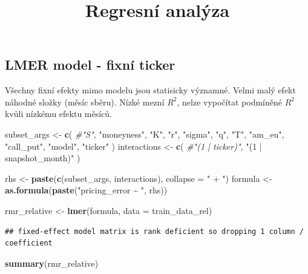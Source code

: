 \documentclass[
]{article}
\title{Regresní analýza}
\author{}
\date{\vspace{-2.5em}}
\newenvironment{Shaded}{\begin{snugshade}}{\end{snugshade}}
\newcommand{\AttributeTok}[1]{\textcolor[rgb]{0.13,0.29,0.53}{#1}}
\newcommand{\CommentTok}[1]{\textcolor[rgb]{0.56,0.35,0.01}{\textit{#1}}}
\newcommand{\FunctionTok}[1]{\textcolor[rgb]{0.13,0.29,0.53}{\textbf{#1}}}
\newcommand{\NormalTok}[1]{#1}
\newcommand{\OtherTok}[1]{\textcolor[rgb]{0.56,0.35,0.01}{#1}}
\newcommand{\StringTok}[1]{\textcolor[rgb]{0.31,0.60,0.02}{#1}}
\begin{document}
\maketitle

\subsection{LMER model - fixní
ticker}\label{lmer-model---fixnuxed-ticker}

Všechny fixní efekty mimo modelu jsou statisicky významné. Velmi malý
efekt náhodné složky (měsíc sběru). Nízké mezní \(R^2\), nelze vypočítat
podmíněné \(R^2\) kvůli nízkému efektu měsíců.

\begin{Shaded}
\begin{Highlighting}[]
\NormalTok{subset\_args }\OtherTok{\textless{}{-}} \FunctionTok{c}\NormalTok{(}
  \CommentTok{\#"S",}
  \StringTok{"moneyness"}\NormalTok{,}
  \StringTok{"K"}\NormalTok{,}
  \StringTok{"r"}\NormalTok{,}
  \StringTok{"sigma"}\NormalTok{,}
  \StringTok{"q"}\NormalTok{,}
  \StringTok{"T"}\NormalTok{,}
  \StringTok{"am\_eu"}\NormalTok{,}
  \StringTok{"call\_put"}\NormalTok{,}
  \StringTok{"model"}\NormalTok{,}
  \StringTok{"ticker"}
\NormalTok{  )}
\NormalTok{interactions }\OtherTok{\textless{}{-}} \FunctionTok{c}\NormalTok{(}
  \CommentTok{\#"(1 | ticker)",}
  \StringTok{"(1 | snapshot\_month)"}
\NormalTok{)}

\NormalTok{rhs }\OtherTok{\textless{}{-}} \FunctionTok{paste}\NormalTok{(}\FunctionTok{c}\NormalTok{(subset\_args, interactions), }\AttributeTok{collapse =} \StringTok{" + "}\NormalTok{)}
\NormalTok{formula }\OtherTok{\textless{}{-}} \FunctionTok{as.formula}\NormalTok{(}\FunctionTok{paste}\NormalTok{(}\StringTok{"pricing\_error \textasciitilde{} "}\NormalTok{, rhs))}

\NormalTok{rmr\_relative }\OtherTok{\textless{}{-}} \FunctionTok{lmer}\NormalTok{(formula, }\AttributeTok{data =}\NormalTok{ train\_data\_rel)}
\end{Highlighting}
\end{Shaded}

\begin{verbatim}
## fixed-effect model matrix is rank deficient so dropping 1 column / coefficient
\end{verbatim}

\begin{Shaded}
\begin{Highlighting}[]
\FunctionTok{summary}\NormalTok{(rmr\_relative)}
\end{Highlighting}
\end{Shaded}
\end{document}

